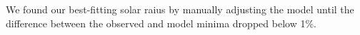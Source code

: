 We found our best-fitting solar raius by manually adjusting the model until the difference between the observed and model minima dropped below 1\%.
